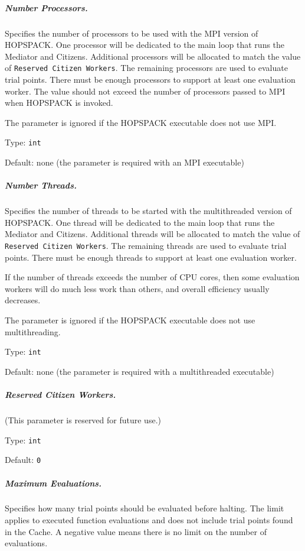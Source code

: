 \subparagraph{Number Processors.}  \label{param:MD-numproc}
Specifies the number of processors to be used with the MPI version of HOPSPACK.
One processor will be dedicated to the main loop that runs the Mediator and
Citizens.  Additional processors will be allocated to match the value of
{\tt Reserved Citizen Workers}.  The remaining processors are used to evaluate
trial points.  There must be enough processors to support at least one
evaluation worker.  The value should not exceed the number of processors
passed to MPI when HOPSPACK is invoked.

\noindent
The parameter is ignored if the HOPSPACK executable does not use MPI.

\hspace{0.2in}
Type: {\tt int}

\hspace{0.2in}
Default: none (the parameter is required with an MPI executable)

\subparagraph{Number Threads.}  \label{param:MD-numthreads}
Specifies the number of threads to be started with the multithreaded version
of HOPSPACK.
One thread will be dedicated to the main loop that runs the Mediator and
Citizens.  Additional threads will be allocated to match the value of
{\tt Reserved Citizen Workers}.  The remaining threads are used to evaluate
trial points.  There must be enough threads to support at least one
evaluation worker.

\noindent
If the number of threads exceeds the number of CPU cores, then some evaluation
workers will do much less work than others, and overall efficiency
usually decreases.

\noindent
The parameter is ignored if the HOPSPACK executable does not use multithreading.

\hspace{0.2in}
Type: {\tt int}

\hspace{0.2in}
Default: none (the parameter is required with a multithreaded executable)

\subparagraph{Reserved Citizen Workers.}  \label{param:MD-resctzns}
(This parameter is reserved for future use.)

\hspace{0.2in}
Type: {\tt int}

\hspace{0.2in}
Default: {\tt 0}

\subparagraph{Maximum Evaluations.}  \label{param:MD-maxeval}
Specifies how many trial points should be evaluated before halting.
The limit applies to executed function evaluations and does not include
trial points found in the Cache.
A negative value means there is no limit on the number of evaluations.

